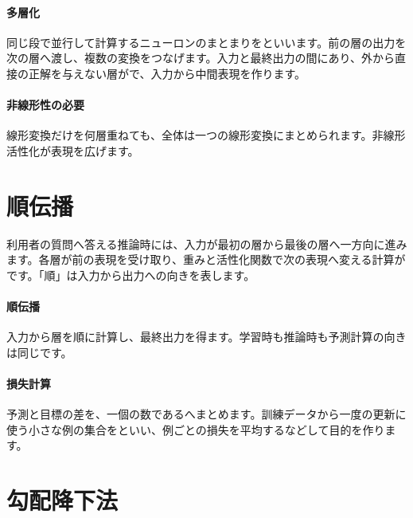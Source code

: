 \par
\endgroup
\medskip
\begingroup
\paragraph{多層化}
        同じ段で並行して計算するニューロンのまとまりをといいます。前の層の出力を次の層へ渡し、複数の変換をつなげます。入力と最終出力の間にあり、外から直接の正解を与えない層がで、入力から中間表現を作ります。

\paragraph{非線形性の必要}
        線形変換だけを何層重ねても、全体は一つの線形変換にまとめられます。非線形活性化が表現を広げます。

\par
\endgroup
\par
\endgroup


\section{順伝播}
\label{sec:06-machine-learning-18}

利用者の質問へ答える推論時には、入力が最初の層から最後の層へ一方向に進みます。各層が前の表現を受け取り、重みと活性化関数で次の表現へ変える計算がです。「順」は入力から出力への向きを表します。

\begingroup
  \centering
  \vspace{5mm}
\begingroup
\paragraph{順伝播}
        入力から層を順に計算し、最終出力を得ます。学習時も推論時も予測計算の向きは同じです。

\par
\endgroup
\medskip
\begingroup
\paragraph{損失計算}
        予測と目標の差を、一個の数であるへまとめます。訓練データから一度の更新に使う小さな例の集合をといい、例ごとの損失を平均するなどして目的を作ります。

\par
\endgroup
\par
\endgroup


\section{勾配降下法}
\label{sec:06-machine-learning-19}

